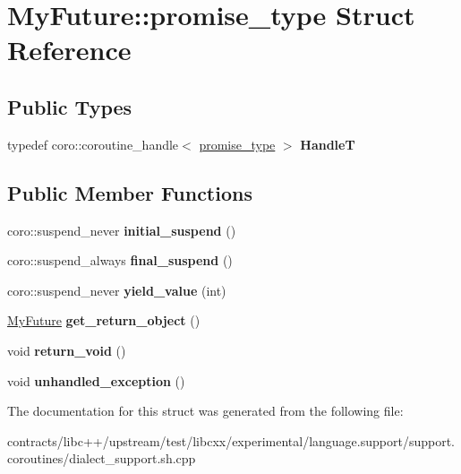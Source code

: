 \hypertarget{struct_my_future_1_1promise__type}{}\section{My\+Future\+:\+:promise\+\_\+type Struct Reference}
\label{struct_my_future_1_1promise__type}
\subsection*{Public Types}
\begin{DoxyCompactItemize}
\item 
\mbox{\label{struct_my_future_1_1promise__type_abfbb8dc04b67e01fca2eb25a1f42983e}} 
typedef coro\+::coroutine\+\_\+handle$<$ \mbox{\hyperlink{struct_my_future_1_1promise__type}{promise\+\_\+type}} $>$ {\bfseries HandleT}
\end{DoxyCompactItemize}
\subsection*{Public Member Functions}
\begin{DoxyCompactItemize}
\item 
\mbox{\label{struct_my_future_1_1promise__type_a4c0bf660b07671b1c4290c70b0d6a512}} 
coro\+::suspend\+\_\+never {\bfseries initial\+\_\+suspend} ()
\item 
\mbox{\label{struct_my_future_1_1promise__type_a9ee9a556f4013c30759d5de644a5f74e}} 
coro\+::suspend\+\_\+always {\bfseries final\+\_\+suspend} ()
\item 
\mbox{\label{struct_my_future_1_1promise__type_a5258a8c3545b3b39313272682159f975}} 
coro\+::suspend\+\_\+never {\bfseries yield\+\_\+value} (int)
\item 
\mbox{\label{struct_my_future_1_1promise__type_a1b24852c744df4fcd589d43eee053034}} 
\mbox{\hyperlink{struct_my_future}{My\+Future}} {\bfseries get\+\_\+return\+\_\+object} ()
\item 
\mbox{\label{struct_my_future_1_1promise__type_a9b4616660d8cc64212005403fcdaf1a0}} 
void {\bfseries return\+\_\+void} ()
\item 
\mbox{\label{struct_my_future_1_1promise__type_a79d1345dd7c9351752fe0cf1c5dfeaa3}} 
void {\bfseries unhandled\+\_\+exception} ()
\end{DoxyCompactItemize}


The documentation for this struct was generated from the following file\+:\begin{DoxyCompactItemize}
\item 
contracts/libc++/upstream/test/libcxx/experimental/language.\+support/support.\+coroutines/dialect\+\_\+support.\+sh.\+cpp\end{DoxyCompactItemize}
